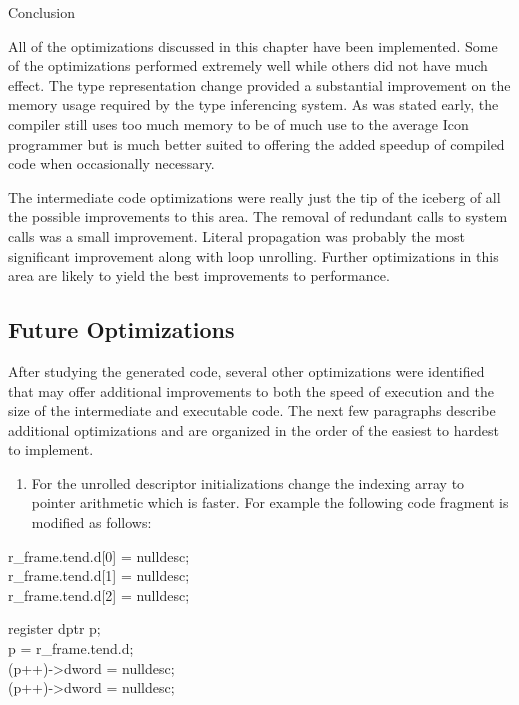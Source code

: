 {\sffamily
Conclusion}

All of the optimizations discussed in this chapter have been
implemented. Some of the optimizations performed extremely well while
others did not have much effect. The type representation change
provided a substantial improvement on the memory usage required by the
type inferencing system. As was stated early, the compiler still uses
too much memory to be of much use to the average Icon programmer but
is much better suited to offering the added speedup of compiled code
when occasionally necessary.

The intermediate code optimizations were really just the tip of the
iceberg of all the possible improvements to this area. The removal of
redundant calls to system calls was a small improvement. Literal
propagation was probably the most significant improvement along with
loop unrolling. Further optimizations in this area are likely to yield
the best improvements to performance.

\subsection{Future Optimizations}

After studying the generated code, several other optimizations were
identified that may offer additional improvements to both the speed of
execution and the size of the intermediate and executable code. The
next few paragraphs describe additional optimizations and are
organized in the order of the easiest to hardest to implement.

\liststyleLxxxvi
\begin{enumerate}
\item 
For the unrolled descriptor initializations change the indexing array to pointer arithmetic which is faster. For example
the following code fragment is modified as follows: 
\end{enumerate}
\goodbreak
\begin{iconcode}
r\_frame.tend.d[0] = nulldesc;\\
r\_frame.tend.d[1] = nulldesc;\\
r\_frame.tend.d[2] = nulldesc;\\
\end{iconcode}
\goodbreak
\makebox[0.5\textwidth]{\hrulefill}
\begin{iconcode}
register dptr p;\\
p = r\_frame.tend.d;\\
(p++)->dword = nulldesc;\\
(p++)->dword = nulldesc;\\
\end{iconcode}

